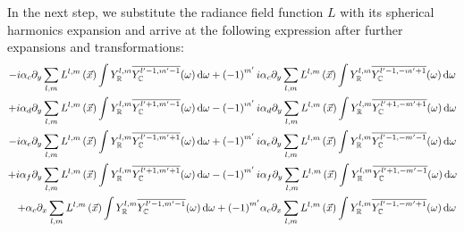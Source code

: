 \documentclass[10pt]{scrartcl}
\begin{document}
In the next step, we substitute the radiance field function $L$ with its spherical harmonics expansion and arrive at the following expression after further expansions and transformations:
\begin{align}
-i\alpha_c\partial_y\sum_{l,m}L^{l,m}\left (\vec{x}\right)\int{Y_{\mathbb{R}}^{l,m}\overline{\SHBC^{l'-1, m'-1}}(\omega )\ud\omega}
+\left({-1}\right)^{m'}i&\alpha_c\partial_y\sum_{l,m}L^{l,m}\left (\vec{x}\right)\int{Y_{\mathbb{R}}^{l,m}\overline{\SHBC^{l'-1, -m'+1}}(\omega )\ud\omega}
\label{eq:real_transport_expansion_unsimplified_term1_term2}
\\
+i\alpha_d\partial_y\sum_{l,m}L^{l,m}\left (\vec{x}\right)\int{Y_{\mathbb{R}}^{l,m}\overline{\SHBC^{l'+1, m'-1}}(\omega )\ud\omega}
-\left({-1}\right)^{m'} i &\alpha_d\partial_y\sum_{l,m}L^{l,m}\left (\vec{x}\right)\int{Y_{\mathbb{R}}^{l,m}\overline{\SHBC^{l'+1, -m'+1}}(\omega )\ud\omega}
\label{eq:real_transport_expansion_unsimplified_term3_term4}
\\
-i\alpha_e \partial_y\sum_{l,m}L^{l,m}\left (\vec{x}\right)\int{Y_{\mathbb{R}}^{l,m}\overline{\SHBC^{l'-1, m'+1}}(\omega )\ud\omega}
+\left({-1}\right)^{m'}i &\alpha_e \partial_y\sum_{l,m}L^{l,m}\left (\vec{x}\right)\int{Y_{\mathbb{R}}^{l,m}\overline{\SHBC^{l'-1, -m'-1}}(\omega )\ud\omega}
\\
+i\alpha_f \partial_y\sum_{l,m}L^{l,m}\left (\vec{x}\right)\int{Y_{\mathbb{R}}^{l,m}\overline{\SHBC^{l'+1, m'+1}}(\omega )\ud\omega}
-\left({-1}\right)^{m'}i &\alpha_f \partial_y\sum_{l,m}L^{l,m}\left (\vec{x}\right)\int{Y_{\mathbb{R}}^{l,m}\overline{\SHBC^{l'+1, -m'-1}}(\omega )\ud\omega}
\\
+\alpha_c\partial_x\sum_{l,m}L^{l,m}\left (\vec{x}\right)\int{Y_{\mathbb{R}}^{l,m}\overline{\SHBC^{l'-1, m'-1}}(\omega )\ud\omega}
+\left({-1}\right)^{m'}&\alpha_c\partial_x\sum_{l,m}L^{l,m}\left (\vec{x}\right)\int{Y_{\mathbb{R}}^{l,m}\overline{\SHBC^{l'-1, -m'+1}}(\omega )\ud\omega}

\end{align}
\end{document}
